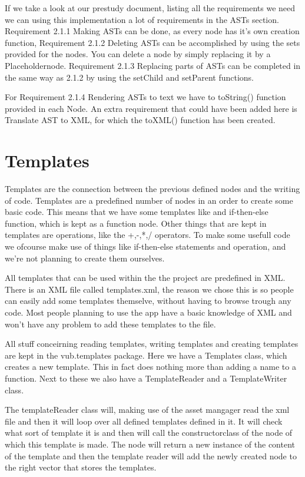 \documentclass[a4paper,12pt]{report}
\begin{document}
If we take a look at our prestudy document, listing all the requirements we need we can using this implementation a lot of requirements in the ASTs section.
Requirement 2.1.1 Making ASTs can be done, as every node has it's own creation function, Requirement 2.1.2 Deleting ASTs can be accomplished by using the sets provided for the nodes. You can delete a node by
simply replacing it by a Placeholdernode. Requirement 2.1.3 Replacing parts of ASTs can be completed in the same way as 2.1.2 by using the setChild and setParent functions.

For Requirement 2.1.4 Rendering ASTs to text we have to toString() function provided in each Node. An extra requirement that could have been added here is Translate AST to XML, for which the toXML() function has been created.


\section{Templates} 
Templates are the connection between the previous defined nodes and the writing of code. Templates are a predefined number of nodes in an order to create some basic code. This means that we have some templates like 
and if-then-else function, which is kept as a function node. Other things that are kept in templates are operations, like the +,-,*,/ operators. To make some usefull code we ofcourse make use of things like if-then-else
statements and operation, and we're not planning to create them ourselves. 

All templates that can be used within the the project are predefined in XML. There is an XML file called templates.xml, the reason we chose this is so people can easily add some templates themselve, without having 
to browse trough any code. Most people planning to use the app have a basic knowledge of XML and won't have any problem to add these templates to the file.

All stuff conceirning reading templates, writing templates and creating templates are kept in the vub.templates package. Here we have a Templates class, which creates a new template. This in fact does nothing more than adding
a name to a function. Next to these we also have a TemplateReader and a TemplateWriter class.

The templateReader class will, making use of the asset mangager read the xml file and then it will loop over all defined templates defined in it. It will check what sort of template it is and then will call the
constructorclass of the node of which this template is made. The node will return a new instance of the content of the template and then the template reader will add the newly created node to the right vector that
stores the templates.
\end{document}
